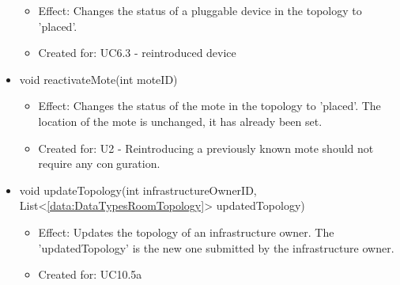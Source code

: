 \begin{description}
\begin{itemize}[noitemsep,nolistsep,leftmargin=-.25cm]
        \begin{itemize}[noitemsep,nolistsep]
           \item Effect: Changes the status of a pluggable device in the topology to 'placed'.
\item Created for: UC6.3 - reintroduced device
        \end{itemize}
      \item \textsf{void reactivateMote(int moteID)}
        \begin{itemize}[noitemsep,nolistsep]
           \item Effect: Changes the status of the mote in the topology to 'placed'. The location of the mote is unchanged, it has already been set.
\item Created for: U2 - Reintroducing a previously known mote should not require any conguration.
        \end{itemize}
      \item \textsf{void updateTopology(int infrastructureOwnerID, List\textless{}\ref{data:DataTypesRoomTopology}\textgreater{} updatedTopology)}
        \begin{itemize}[noitemsep,nolistsep]
           \item Effect: Updates the topology of an infrastructure owner. The 'updatedTopology' is the new one submitted by the infrastructure owner.
\item Created for: UC10.5a
        \end{itemize}
    \end{itemize}
    \end{description}

